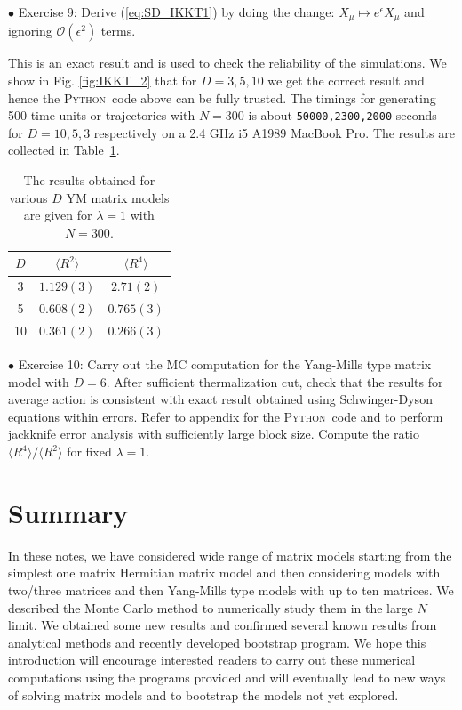 \documentclass[11pt]{article}
\newcommand{\PY}{\textsc{Python}}
\begin{document}
\begin{mdframed}[backgroundcolor=blue!3] 
	\textsc{} 
	$\bullet$ Exercise 9: Derive (\ref{eq:SD_IKKT1}) by doing the change: $X_{\mu} \mapsto e^{\epsilon}X_{\mu}$ and ignoring 
	$\mathcal{O}(\epsilon^{2})$ terms.
\end{mdframed}

This is an exact result and is used to check the reliability of the simulations. 
We show in Fig. \ref{fig:IKKT_2} that for $D=3,5,10$ we get the correct result and 
hence the \PY~code above can be fully trusted. The timings for generating 500 time units or trajectories 
with $N=300$ is about \texttt{50000,2300,2000} seconds for $D = 10, 5, 3$ respectively on 
a 2.4 GHz i5 A1989 MacBook Pro. The results are collected in Table~\ref{table:D_IKKT_data}. 
\begin{table}[h!]
	\centering
	\begin{tabular}{||c c c||} 
		\hline
		$D$ & $ \langle R^2 \rangle$ & $ \langle R^4 \rangle$ \\ [0.5ex] 
		\hline\hline
		3 & $1.129(3) $ & $2.71(2) $  \\ 
		5 & $0.608(2) $ & $0.765(3) $  \\
		10 & $0.361(2)$ & $0.266(3)$
		 \\ [1ex] 
		\hline 
	\end{tabular}
\caption{The results obtained for various $D$ YM matrix models are given for $\lambda=1$ with $N=300$.}
\label{table:D_IKKT_data}
\end{table}

\begin{mdframed}[backgroundcolor=blue!3] 
	\textsc{} 
	$\bullet$ Exercise 10: Carry out the MC computation for the Yang-Mills type matrix model with $D=6$. After sufficient thermalization cut, check that the results for average action is consistent with exact result obtained using Schwinger-Dyson equations within errors. Refer to appendix for the \PY~code and to perform jackknife error analysis with sufficiently large block size. Compute the ratio $\langle R^4 \rangle / \langle R^2 \rangle$ for fixed $\lambda=1$. 
\end{mdframed} 


\section{Summary}
In these notes, we have considered wide range of matrix models starting from the simplest one matrix Hermitian matrix model and then considering models with two/three matrices and then Yang-Mills type models with up to ten matrices. We described the Monte Carlo method 
to numerically study them in the large $N$ limit. We obtained some new results and confirmed several known results from analytical methods and recently developed bootstrap program. We hope this introduction will encourage interested readers 
to carry out these numerical computations using the programs provided and will eventually lead to new ways of solving matrix models and to bootstrap the models not yet explored.
 
\end{document}
